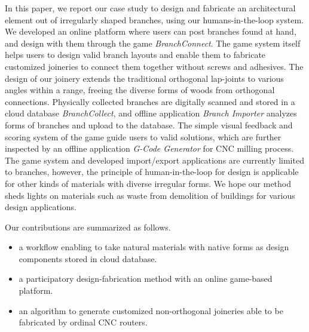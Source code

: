 In this paper, we report our case study to design and fabricate an architectural element out of irregularly shaped branches, using our humans-in-the-loop system.
We developed an online platform where users can post branches found at hand, and design with them through the game \textit{BranchConnect}.
The game system itself helps users to design valid branch layouts and enable them to fabricate customized joineries to connect them together without screws and adhesives.
The design of our joinery extends the traditional orthogonal lap-joints to various angles within a range, freeing the diverse forms of woods from orthogonal connections.
Physically collected branches are digitally scanned and stored in a cloud database \textit{BranchCollect}, and offline application \textit{Branch Importer} analyzes forms of branches and upload to the database.
The simple visual feedback and scoring system of the game guide users to valid solutions, which are further inspected by an offline application \textit{G-Code Generator} for CNC milling process.
The game system and developed import/export applications are currently limited to branches, however, the principle of human-in-the-loop for design is applicable for other kinds of materials with diverse irregular forms.
We hope our method sheds lights on materials such as waste from demolition of buildings for various design applications.


Our contributions are summarized as follows.
\begin{itemize}
 \item{a workflow enabling to take natural materials with native forms as design components stored in cloud database.}
 \item{a participatory design-fabrication method with an online game-based platform.}
 \item{an algorithm to generate customized non-orthogonal joineries able to be fabricated by ordinal CNC routers.}
\end{itemize}



